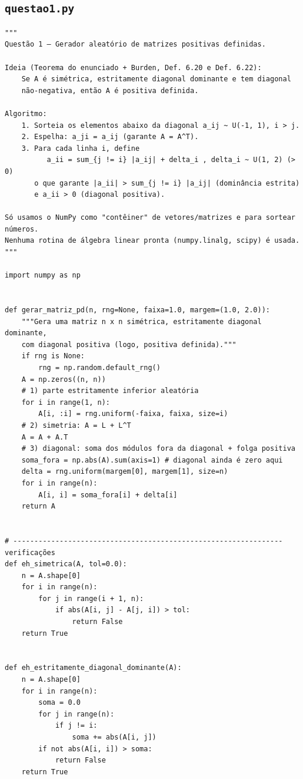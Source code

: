 \documentclass{article}
\theoremstyle{remark}
\begin{document}
\subsection*{\texttt{questao1.py}}
\begin{lstlisting}
"""
Questão 1 — Gerador aleatório de matrizes positivas definidas.

Ideia (Teorema do enunciado + Burden, Def. 6.20 e Def. 6.22):
    Se A é simétrica, estritamente diagonal dominante e tem diagonal
    não-negativa, então A é positiva definida.

Algoritmo:
    1. Sorteia os elementos abaixo da diagonal a_ij ~ U(-1, 1), i > j.
    2. Espelha: a_ji = a_ij (garante A = A^T).
    3. Para cada linha i, define
          a_ii = sum_{j != i} |a_ij| + delta_i , delta_i ~ U(1, 2) (> 0)
       o que garante |a_ii| > sum_{j != i} |a_ij| (dominância estrita)
       e a_ii > 0 (diagonal positiva).

Só usamos o NumPy como "contêiner" de vetores/matrizes e para sortear números.
Nenhuma rotina de álgebra linear pronta (numpy.linalg, scipy) é usada.
"""

import numpy as np


def gerar_matriz_pd(n, rng=None, faixa=1.0, margem=(1.0, 2.0)):
    """Gera uma matriz n x n simétrica, estritamente diagonal dominante,
    com diagonal positiva (logo, positiva definida)."""
    if rng is None:
        rng = np.random.default_rng()
    A = np.zeros((n, n))
    # 1) parte estritamente inferior aleatória
    for i in range(1, n):
        A[i, :i] = rng.uniform(-faixa, faixa, size=i)
    # 2) simetria: A = L + L^T
    A = A + A.T
    # 3) diagonal: soma dos módulos fora da diagonal + folga positiva
    soma_fora = np.abs(A).sum(axis=1) # diagonal ainda é zero aqui
    delta = rng.uniform(margem[0], margem[1], size=n)
    for i in range(n):
        A[i, i] = soma_fora[i] + delta[i]
    return A


# ---------------------------------------------------------------- verificações
def eh_simetrica(A, tol=0.0):
    n = A.shape[0]
    for i in range(n):
        for j in range(i + 1, n):
            if abs(A[i, j] - A[j, i]) > tol:
                return False
    return True


def eh_estritamente_diagonal_dominante(A):
    n = A.shape[0]
    for i in range(n):
        soma = 0.0
        for j in range(n):
            if j != i:
                soma += abs(A[i, j])
        if not abs(A[i, i]) > soma:
            return False
    return True



\end{lstlisting}
\end{document}
